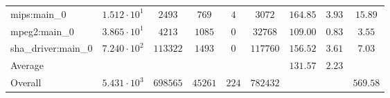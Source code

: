 \begin{tabular}{|l|c|c|c|c|c|c|c|c|}
mips:main\_0            & $ 1.512 \cdot 10^{1}  $ & $ 2493   $ & $ 769   $ & $ 4   $ & $ 3072   $ & $ 164.85      $ & $ 3.93    $ & $ 15.89   $ \\
mpeg2:main\_0           & $ 3.865 \cdot 10^{1}  $ & $ 4213   $ & $ 1085  $ & $ 0   $ & $ 32768  $ & $ 109.00      $ & $ 0.83    $ & $ 3.55    $ \\
sha\_driver:main\_0     & $ 7.240 \cdot 10^{2}  $ & $ 113322 $ & $ 1493  $ & $ 0   $ & $ 117760 $ & $ 156.52      $ & $ 3.61    $ & $ 7.03    $ \\
\hline
Average                 & $                     $ & $        $ & $       $ & $     $ & $        $ & $ 131.57      $ & $ 2.23    $ & $         $ \\
\hline
Overall                 & $ 5.431 \cdot 10^{3}  $ & $ 698565 $ & $ 45261 $ & $ 224 $ & $ 782432 $ & $             $ & $         $ & $ 569.58  $ \\
\hline
\end{tabular}
